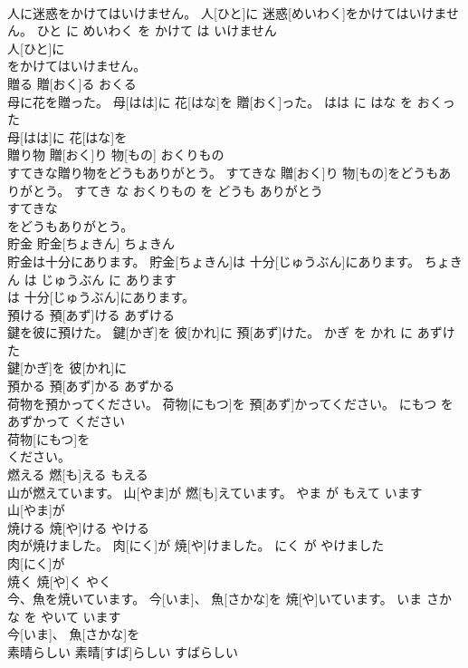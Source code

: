 \documentclass[8pt]{extreport}
\begin{document}
\begin{CJK}{UTF8}{min}
\\	人に迷惑をかけてはいけません。	人[ひと]に 迷惑[めいわく]をかけてはいけません。	ひと に めいわく を かけて は いけません	
\\	人[ひと]に
\\	をかけてはいけません。			
\\	贈る	贈[おく]る	おくる	
\\	母に花を贈った。	母[はは]に 花[はな]を 贈[おく]った。	はは に はな を おくった	
\\	母[はは]に 花[はな]を
\\	贈り物	贈[おく]り 物[もの]	おくりもの	
\\	すてきな贈り物をどうもありがとう。	すてきな 贈[おく]り 物[もの]をどうもありがとう。	すてき な おくりもの を どうも ありがとう	
\\	すてきな
\\	をどうもありがとう。			
\\	貯金	貯金[ちょきん]	ちょきん	
\\	貯金は十分にあります。	貯金[ちょきん]は 十分[じゅうぶん]にあります。	ちょきん は じゅうぶん に あります	
\\	は 十分[じゅうぶん]にあります。			
\\	預ける	預[あず]ける	あずける	
\\	鍵を彼に預けた。	鍵[かぎ]を 彼[かれ]に 預[あず]けた。	かぎ を かれ に あずけた	
\\	鍵[かぎ]を 彼[かれ]に
\\	預かる	預[あず]かる	あずかる	
\\	荷物を預かってください。	荷物[にもつ]を 預[あず]かってください。	にもつ を あずかって ください	
\\	荷物[にもつ]を
\\	ください。			
\\	燃える	燃[も]える	もえる	
\\	山が燃えています。	山[やま]が 燃[も]えています。	やま が もえて います	
\\	山[やま]が
\\	焼ける	焼[や]ける	やける	
\\	肉が焼けました。	肉[にく]が 焼[や]けました。	にく が やけました	
\\	肉[にく]が
\\	焼く	焼[や]く	やく	
\\	今、魚を焼いています。	今[いま]、 魚[さかな]を 焼[や]いています。	いま さかな を やいて います	
\\	今[いま]、 魚[さかな]を
\\	素晴らしい	素晴[すば]らしい	すばらしい	

\end{CJK}
\end{document}

